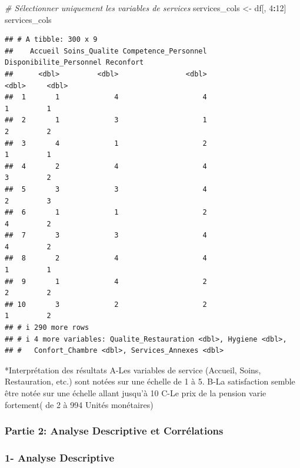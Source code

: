 \documentclass[
]{article}
\newenvironment{Shaded}{\begin{snugshade}}{\end{snugshade}}
\newcommand{\CommentTok}[1]{\textcolor[rgb]{0.56,0.35,0.01}{\textit{#1}}}
\newcommand{\DecValTok}[1]{\textcolor[rgb]{0.00,0.00,0.81}{#1}}
\newcommand{\NormalTok}[1]{#1}
\newcommand{\OtherTok}[1]{\textcolor[rgb]{0.56,0.35,0.01}{#1}}
\newcommand{\SpecialCharTok}[1]{\textcolor[rgb]{0.81,0.36,0.00}{\textbf{#1}}}
\begin{document}
\begin{Shaded}
\begin{Highlighting}[]
\CommentTok{\# Sélectionner uniquement les variables de services}
\NormalTok{services\_cols }\OtherTok{\textless{}{-}}\NormalTok{ df[, }\DecValTok{4}\SpecialCharTok{:}\DecValTok{12}\NormalTok{]}
\NormalTok{services\_cols}
\end{Highlighting}
\end{Shaded}

\begin{verbatim}
## # A tibble: 300 x 9
##    Accueil Soins_Qualite Competence_Personnel Disponibilite_Personnel Reconfort
##      <dbl>         <dbl>                <dbl>                   <dbl>     <dbl>
##  1       1             4                    4                       1         1
##  2       1             3                    1                       2         2
##  3       4             1                    2                       1         1
##  4       2             4                    4                       3         2
##  5       3             3                    4                       2         3
##  6       1             1                    2                       4         2
##  7       3             3                    4                       4         2
##  8       2             4                    4                       1         1
##  9       1             4                    2                       2         2
## 10       3             2                    2                       1         2
## # i 290 more rows
## # i 4 more variables: Qualite_Restauration <dbl>, Hygiene <dbl>,
## #   Confort_Chambre <dbl>, Services_Annexes <dbl>
\end{verbatim}

*Interprétation des résultats A-Les variables de service (Accueil,
Soins, Restauration, etc.) sont notées sur une échelle de 1 à 5. B-La
satisfaction semble être notée sur une échelle allant jusqu'à 10 C-Le
prix de la pension varie fortement( de 2 à 994 Unités monétaires)

\subsubsection{Partie 2: Analyse Descriptive et
Corrélations}\label{partie-2-analyse-descriptive-et-corruxe9lations}

\subsubsection{1- Analyse Descriptive}\label{analyse-descriptive}
\end{document}
